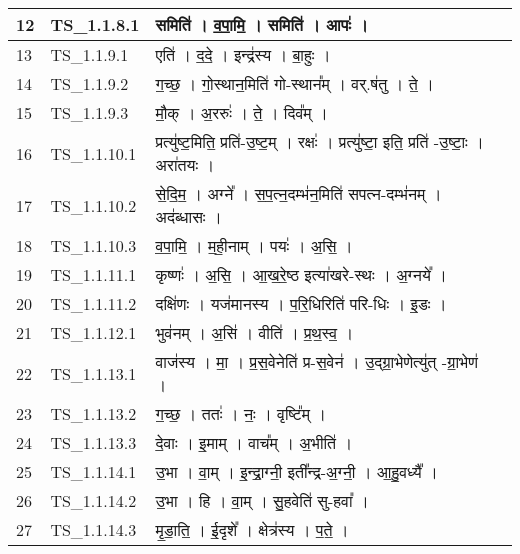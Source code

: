 \documentclass[17pt]{extarticle}
\begin{document}
\begin{longtable}{||p{0.4in}||p{0.9in}||p{4.0in}||p{0.9in}||}
        \hline
            12 & TS\_1.1.8.1 & समिति॑   ।   व॒पा॒मि॒   ।   समिति॑   ।   आपः॑   ।    &      \\
        \hline
            13 & TS\_1.1.9.1 & एति॑   ।   द॒दे॒   ।   इन्द्र॑स्य   ।   बा॒हुः   ।    &      \\
        \hline
            14 & TS\_1.1.9.2 & ग॒च्छ॒   ।   गो॒स्थान॒मिति॑ गो{-}स्थान᳚म्   ।   वर्.ष॑तु   ।   ते॒   ।    &      \\
        \hline
            15 & TS\_1.1.9.3 & मौ॒क्   ।   अ॒ररुः॑   ।   ते॒   ।   दिव᳚म्   ।    &      \\
        \hline
            16 & TS\_1.1.10.1 & प्रत्यु॑ष्ट॒मिति॒ प्रति॑{-}उ॒ष्ट॒म्   ।   रक्षः॑   ।   प्रत्यु॑ष्टा॒ इति॒ प्रति॑ {-}उ॒ष्टाः॒   ।   अरा॑तयः   ।    &      \\
        \hline
            17 & TS\_1.1.10.2 & से॒दि॒म॒   ।   अग्ने᳚   ।   स॒प॒त्न॒दम्भ॑न॒मिति॑ सपत्न{-}दम्भ॑नम्   ।   अद॑ब्धासः   ।    &      \\
        \hline
            18 & TS\_1.1.10.3 & व॒पा॒मि॒   ।   म॒ही॒नाम्   ।   पयः॑   ।   अ॒सि॒   ।    &      \\
        \hline
            19 & TS\_1.1.11.1 & कृष्णः॑   ।   अ॒सि॒   ।   आ॒ख॒रे॒ष्ठ इत्या॑खरे{-}स्थः   ।   अ॒ग्नये᳚   ।    &      \\
        \hline
            20 & TS\_1.1.11.2 & दक्षि॑णः   ।   यज॑मानस्य   ।   प॒रि॒धिरिति॑ परि{-}धिः   ।   इ॒डः   ।    &      \\
        \hline
            21 & TS\_1.1.12.1 & भुव॑नम्   ।   अ॒सि॑   ।   वीति॑   ।   प्र॒थ॒स्व॒   ।    &      \\
        \hline
            22 & TS\_1.1.13.1 & वाज॑स्य   ।   मा॒   ।   प्र॒स॒वेनेति॑ प्र{-}स॒वेन॑   ।   उ॒द्ग्रा॒भेणेत्यु॑त् {-}ग्रा॒भेण॑   ।    &      \\
        \hline
            23 & TS\_1.1.13.2 & ग॒च्छ॒   ।   ततः॑   ।   नः॒   ।   वृष्टि᳚म्   ।    &      \\
        \hline
            24 & TS\_1.1.13.3 & दे॒वाः   ।   इ॒माम्   ।   वाच᳚म्   ।   अ॒भीति॑   ।    &      \\
        \hline
            25 & TS\_1.1.14.1 & उ॒भा   ।   वा॒म्   ।   इ॒न्द्रा॒ग्नी॒ इती᳚न्द्र{-}अ॒ग्नी॒   ।   आ॒हु॒वध्यै᳚   ।    &      \\
        \hline
            26 & TS\_1.1.14.2 & उ॒भा   ।   हि   ।   वा॒म्   ।   सु॒हवेति॑ सु{-}हवा᳚   ।    &      \\
        \hline
            27 & TS\_1.1.14.3 & मृ॒डा॒ति॒   ।   ई॒दृशे᳚   ।   क्षेत्र॑स्य   ।   प॒ते॒   ।    &      \\

\end{longtable}
\end{document}
